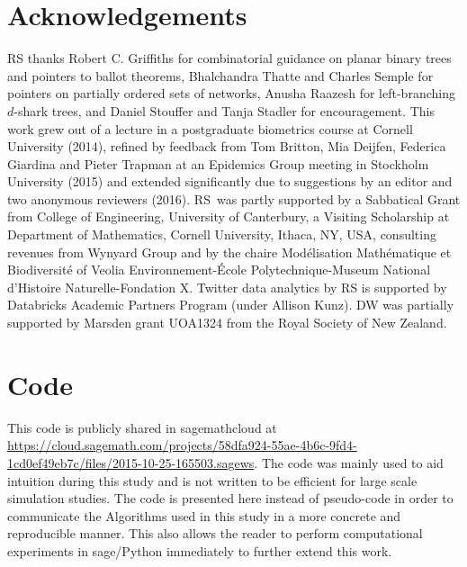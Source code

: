 \documentclass[review]{elsarticle}
\numberwithin{equation}{section}
\begin{document}
\section*{Acknowledgements}
RS thanks Robert C. Griffiths for combinatorial guidance on planar binary trees and pointers to ballot theorems, Bhalchandra Thatte and Charles Semple for pointers on partially ordered sets of networks, Anusha Raazesh for left-branching $d$-shark trees, and Daniel Stouffer and Tanja Stadler for encouragement.  
This work grew out of a lecture in a postgraduate biometrics course at Cornell University (2014), refined by feedback from Tom Britton, Mia Deijfen, Federica Giardina and Pieter Trapman at an Epidemics Group meeting in Stockholm University (2015) and extended significantly due to suggestions by an editor and two anonymous reviewers (2016).  
RS~was partly supported by a Sabbatical Grant from College of Engineering, University of Canterbury, a Visiting Scholarship at Department of Mathematics, Cornell University, Ithaca, NY, USA, consulting revenues from Wynyard Group and by the chaire Mod\'elisation Math\'ematique et Biodiversit\'e of Veolia Environnement-\'Ecole Polytechnique-Museum National d'Histoire Naturelle-Fondation X.  Twitter data analytics by RS is supported by Databricks Academic Partners Program (under Allison Kunz). DW was partially supported by Marsden grant UOA1324 from the Royal Society of New Zealand.



\appendix
\section{Code}\label{sec:Code}

This code is publicly shared in sagemathcloud at {\scriptsize \url{https://cloud.sagemath.com/projects/58dfa924-55ae-4b6c-9fd4-1cd0ef49eb7c/files/2015-10-25-165503.sagews}}.
The code was mainly used to aid intuition during this study and is not written to be efficient for large scale simulation studies. 
The code is presented here instead of pseudo-code in order to communicate the Algorithms used in this study in a more concrete and reproducible manner.  
This also allows the reader to perform computational experiments in sage/Python immediately to further extend this work. 
\end{document}
